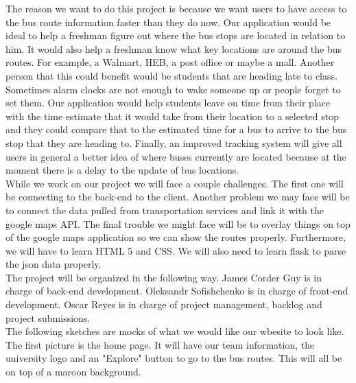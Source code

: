 \documentclass[12pt]{report}
\begin{document}
	The reason we want to do this project is because we want users to have access to the bus route information faster than they do now. Our application would be ideal to help a freshman figure out where the bus stops are located in relation to him. It would also help a freshman know what key locations are around the bus routes. For example, a Walmart, HEB, a post office or maybe a mall. Another person that this could benefit would be students that are heading late to class. Sometimes alarm clocks are not enough to wake someone up or people forget to set them. Our application would help students leave on time from their place with the time estimate that it would take from their location to a selected stop and they could compare that to the estimated time for a bus to arrive to the bus stop that they are heading to. Finally, an improved tracking system will give all users in general a better idea of where buses currently are located because at the moment there is a delay to the update of bus locations.\\
	
	While we work on our project we will face a couple challenges. The first one will be connecting to the back-end to the client. Another problem we may face will be to connect the data pulled from transportation services and link it with the google maps API. The final trouble we might face will be to overlay things on top of the google maps application so we can show the routes properly. Furthermore, we will have to learn HTML 5 and CSS. We will also need to learn flask to parse the json data properly.\\
	
	The project will be organized in the following way. James Corder Guy is in charge of back-end development. Oleksandr Sofishchenko is in charge of front-end development. Oscar Reyes is in charge of project management, backlog and project submissions.\\
	
	The following sketches are mocks of what we would like our wbesite to look like. The first picture is the home page. It will have our team information, the university logo and an "Explore" button to go to the bus routes. This will all be on top of a maroon background. \\
	 
\end{document}

